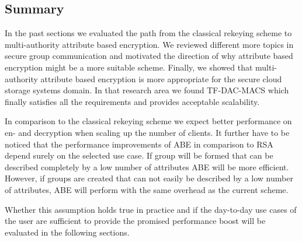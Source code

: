 \subsection{Summary}
In the past sections we evaluated the path from the classical rekeying scheme to multi-authority attribute based encryption. We reviewed different more topics in secure group communication and motivated the direction of why attribute based encryption might be a more suitable scheme. Finally, we showed that multi-authority attribute based encryption is more appropriate for the secure cloud storage systems domain. In that research area we found TF-DAC-MACS which finally satisfies all the requirements and provides acceptable scalability. 

In comparison to the classical rekeying scheme we expect better performance on en- and decryption when scaling up the number of clients. It further have to be noticed that the performance improvements of ABE in comparison to RSA depend surely on the selected use case. If group will be formed that can be described completely by a low number of attributes ABE will be more efficient. However, if groups are created that can not easily be described by a low number of attributes, ABE will perform with the same overhead as the current scheme. 

Whether this assumption holds true in practice and if the day-to-day use cases of the user are sufficient to provide the promised performance boost will be evaluated in the following sections.